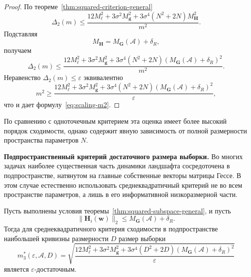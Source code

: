 \begin{proof}
    По теореме~\ref{thm:squared-criterion-general}
    \begin{equation}
        \Delta_2(m)
        \le
        \frac{
            12M_{\ell}^2
            +
            3\sigma^2 M_{\mathbf g}^2
            +
            3\sigma^4(N^2+2N)M_{\mathbf H}^2
        }{m^2}.
    \end{equation}
    Подставляя
    \begin{equation}
        M_{\mathbf H}=M_{\mathbf G}(\mathcal A)+\delta_R,
    \end{equation}
    получаем
    \begin{equation}
        \Delta_2(m)
        \le
        \frac{
            12M_{\ell}^2
            +
            3\sigma^2 M_{\mathbf g}^2
            +
            3\sigma^4(N^2+2N)\left(M_{\mathbf G}(\mathcal A)+\delta_R\right)^2
        }{m^2}.
    \end{equation}
    Неравенство $\Delta_2(m)\le\varepsilon$ эквивалентно
    \begin{equation}
        m^2
        \ge
        \frac{
            12M_{\ell}^2
            +
            3\sigma^2 M_{\mathbf g}^2
            +
            3\sigma^4(N^2+2N)\left(M_{\mathbf G}(\mathcal A)+\delta_R\right)^2
        }{\varepsilon},
    \end{equation}
    что и дает формулу~\eqref{eq:scaling-m2}.
\end{proof}

По сравнению с одноточечным критерием эта оценка имеет более высокий порядок сходимости, однако содержит явную зависимость от полной размерности пространства параметров $N$.

\textbf{Подпространственный критерий достаточного размера выборки.} Во многих задачах наиболее существенная часть динамики ландшафта сосредоточена в подпространстве, натянутом на главные собственные векторы матрицы Гессе. В этом случае естественно использовать среднеквадратичный критерий не во всем пространстве параметров, а лишь в его информативной низкоразмерной части.

\begin{theorem}
    \label{thm:scaling-sufficient-subspace}
    Пусть выполнены условия теоремы~\ref{thm:squared-subspace-general}, и пусть
    \begin{equation}
        \|\mathbf H_i(\mathbf w)\|_2
        \le
        M_{\mathbf G}(\mathcal A)+\delta_R.
    \end{equation}
    Тогда для среднеквадратичного критерия сходимости в подпространстве наибольшей кривизны размерности $D$ размер выборки
    \begin{equation}
        \label{eq:scaling-m3}
        m_3^*(\varepsilon, \mathcal A, D)
        =
        \sqrt{
            \frac{
                12M_{\ell}^2
                +
                3\sigma^2 M_{\mathbf g}^2
                +
                3\sigma^4(D^2+2D)\left(M_{\mathbf G}(\mathcal A)+\delta_R\right)^2
            }{\varepsilon}
        }
    \end{equation}
    является $\varepsilon$-достаточным.
\end{theorem}

